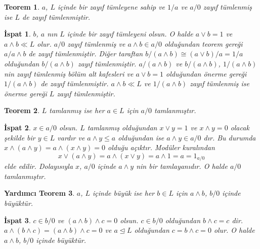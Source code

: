 \documentclass[a4paper,12pt]{article}
\numberwithin{equation}{section}
\theoremstyle{italik}
\newtheorem{teorem}{Teorem}[section]
\newtheorem{lemma}[teorem]{Yardımcı Teorem}
\newtheorem*{ispat}{İspat}
\begin{document}
\begin{teorem}
 $ a $, $ L $ içinde bir zayıf tümleyene sahip ve $ 1/a $ ve $ a/0 $ zayıf tümlenmiş ise $ L $ de zayıf tümlenmiştir.
\end{teorem}
\begin{ispat}
 $ b $, $ a $ nın $ L $ içinde bir zayıf tümleyeni olsun. O halde $ a \vee b = 1 $ ve $ a \wedge b \ll L $ olur. 
$ a/0 $ zayıf tümlenmiş ve $ a \wedge b \in a/0 $ olduğundan teorem gereği $ a / a \wedge b $ de zayıf tümlenmiştir. 
Diğer taraftan $ b/(a \wedge b) \cong (a \vee b)/a = 1/a $ olduğundan $ b/(a \wedge b) $ zayıf tümlenmiştir. 
$ a/(a \wedge b) $ ve $ b/(a \wedge b) $, $ 1/(a \wedge b) $ nin zayıf tümlenmiş bölüm alt kafesleri ve $ a \vee b = 1 $ olduğundan 
önerme gereği $ 1/(a \wedge b) $ de zayıf tümlenmiştir. 
$ a \wedge b \ll L $ ve $ 1/(a \wedge b) $ zayıf tümlenmiş ise önerme gereği $ L $ zayıf tümlenmiştir.
\end{ispat}
\begin{teorem}
 $ L $ tamlanmış ise her $ a \in L $ için $ a/0 $ tamlanmıştır.
\end{teorem}
\begin{ispat}
 $ x \in a/0 $ olsun. $ L $ tamlanmış olduğundan $ x \vee y = 1 $ ve $ x \wedge y = 0 $ olacak şekilde bir $ y \in L $ vardır 
ve $ a \wedge y \leq a $ olduğundan ise $ a \wedge y \in a/0 $ dır. Bu durumda $ x \wedge (a \wedge y) = a \wedge (x \wedge y) = 0 $ olduğu açıktır. 
Modüler kuralından
\[
 x \vee (a \wedge y) =  a \wedge (x \vee y) = a \wedge 1 = a = 1_{a/0}
\]
elde edilir. Dolayısıyla $ x $, $ a/0 $ içinde $ a \wedge y $ nin bir tamlayanıdır. O halde $ a/0 $ tamlanmıştır.

\end{ispat}
\begin{lemma}
 $a$, $ L $ içinde büyük ise her $ b \in L $ için $a \wedge b$, $b/0$ içinde büyüktür.
\end{lemma}
\begin{ispat}
 $ c \in b/0 $ ve $(a \wedge b) \wedge c=0$ olsun. $ c \in b/0 $ olduğundan $ b \wedge c = c $ dir. 
 $a \wedge (b \wedge c) =(a \wedge b) \wedge c=0$ ve $a \trianglelefteq L $ olduğundan $c = b \wedge c = 0$ olur. 
O halde $a \wedge b$, $b/0$ içinde büyüktür.

\end{ispat}
\end{document}
